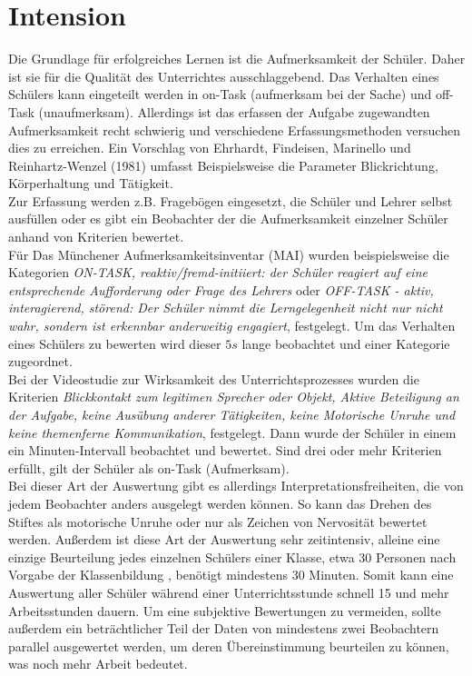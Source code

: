 \section{Intension}
\label{intension}
Die Grundlage für erfolgreiches Lernen ist die Aufmerksamkeit der Schüler. Daher ist sie für die Qualität des Unterrichtes ausschlaggebend. Das Verhalten eines Schülers kann eingeteilt werden in on-Task (aufmerksam bei der Sache) und off-Task (unaufmerksam). Allerdings ist das erfassen der Aufgabe zugewandten Aufmerksamkeit recht schwierig und verschiedene Erfassungsmethoden versuchen dies zu erreichen. Ein Vorschlag von Ehrhardt, Findeisen, Marinello und Reinhartz-Wenzel (1981) umfasst Beispielsweise die Parameter Blickrichtung, Körperhaltung und Tätigkeit.\\
Zur Erfassung werden z.B. Fragebögen eingesetzt, die Schüler und Lehrer selbst ausfüllen oder es gibt ein Beobachter der die Aufmerksamkeit einzelner Schüler anhand von Kriterien bewertet.\\
Für \glqq Das Münchener Aufmerksamkeitsinventar (MAI)\grqq \cite{MAI_Verhaltensbeobachtung} wurden beispielsweise die Kategorien \textit{\glqq ON-TASK, reaktiv/fremd-initiiert: der Schüler reagiert auf eine entsprechende Aufforderung oder Frage des Lehrers\grqq} oder \textit{\glqq OFF-TASK - aktiv, interagierend, störend: Der Schüler nimmt die Lerngelegenheit nicht nur nicht wahr, sondern ist erkennbar anderweitig engagiert\grqq}, festgelegt. Um das Verhalten eines Schülers zu bewerten wird dieser $5s$ lange beobachtet und einer Kategorie zugeordnet.\\
Bei der \glqq Videostudie zur Wirksamkeit des Unterrichtsprozesses \grqq \cite{aufmerksamkeit_Studie} wurden die Kriterien \textit{\glqq Blickkontakt zum legitimen Sprecher oder Objekt, Aktive Beteiligung an der Aufgabe, keine Ausübung anderer Tätigkeiten, keine Motorische Unruhe und keine themenferne Kommunikation\grqq}, festgelegt. Dann wurde der Schüler in einem ein Minuten-Intervall beobachtet und bewertet. Sind drei oder mehr Kriterien erfüllt, gilt der Schüler als on-Task (Aufmerksam).\\
Bei dieser Art der Auswertung gibt es allerdings Interpretationsfreiheiten, die von jedem Beobachter anders ausgelegt werden können. So kann das Drehen des Stiftes als motorische Unruhe oder nur als Zeichen von Nervosität bewertet werden. Außerdem ist diese Art der Auswertung sehr zeitintensiv, alleine eine einzige Beurteilung jedes einzelnen Schülers einer Klasse, etwa 30 Personen nach Vorgabe der Klassenbildung \cite{klassenteiler}, benötigt mindestens 30 Minuten. Somit kann eine Auswertung aller Schüler während einer Unterrichtsstunde schnell 15 und mehr Arbeitsstunden dauern. Um eine subjektive Bewertungen zu vermeiden, sollte außerdem ein beträchtlicher Teil der Daten von mindestens zwei Beobachtern parallel ausgewertet werden, um deren Übereinstimmung beurteilen zu können, was noch mehr Arbeit bedeutet.\\
